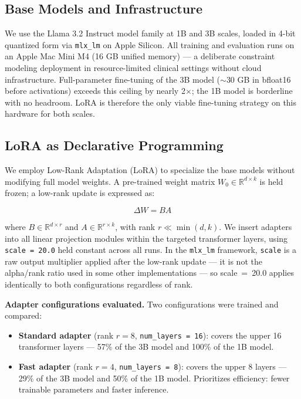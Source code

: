 \documentclass[AMA,Times1COL]{WileyNJDv5} %
\begin{document}
\subsection{Base Models and Infrastructure}

We use the Llama 3.2 Instruct model family \cite{dubey2024llama3} at 1B and 3B scales, loaded in 4-bit quantized form via \texttt{mlx\_lm} \cite{apple2023mlx} on Apple Silicon. All training and evaluation runs on an Apple Mac Mini M4 (16 GB unified memory) --- a deliberate constraint modeling deployment in resource-limited clinical settings without cloud infrastructure. Full-parameter fine-tuning of the 3B model ($\sim$30 GB in bfloat16 before activations) exceeds this ceiling by nearly 2$\times$; the 1B model is borderline with no headroom. LoRA is therefore the only viable fine-tuning strategy on this hardware for both scales.

\subsection{LoRA as Declarative Programming}

We employ Low-Rank Adaptation (LoRA) \cite{hu2022lora} to specialize the base models without modifying full model weights. A pre-trained weight matrix $W_0 \in \mathbb{R}^{d \times k}$ is held frozen; a low-rank update is expressed as:

\begin{equation}
\Delta W = BA
\end{equation}

where $B \in \mathbb{R}^{d \times r}$ and $A \in \mathbb{R}^{r \times k}$, with rank $r \ll \min(d, k)$. We insert adapters into all linear projection modules within the targeted transformer layers, using \texttt{scale = 20.0} held constant across all runs. In the \texttt{mlx\_lm} framework, \texttt{scale} is a raw output multiplier applied after the low-rank update --- it is not the alpha/rank ratio used in some other implementations --- so scale~=~20.0 applies identically to both configurations regardless of rank.

\textbf{Adapter configurations evaluated.} Two configurations were trained and compared:

\begin{itemize}
    \item \textbf{Standard adapter} (rank $r = 8$, \texttt{num\_layers = 16}): covers the upper 16 transformer layers --- 57\% of the 3B model and 100\% of the 1B model.
    \item \textbf{Fast adapter} (rank $r = 4$, \texttt{num\_layers = 8}): covers the upper 8 layers --- 29\% of the 3B model and 50\% of the 1B model. Prioritizes efficiency: fewer trainable parameters and faster inference.
\end{itemize}
\end{document}
